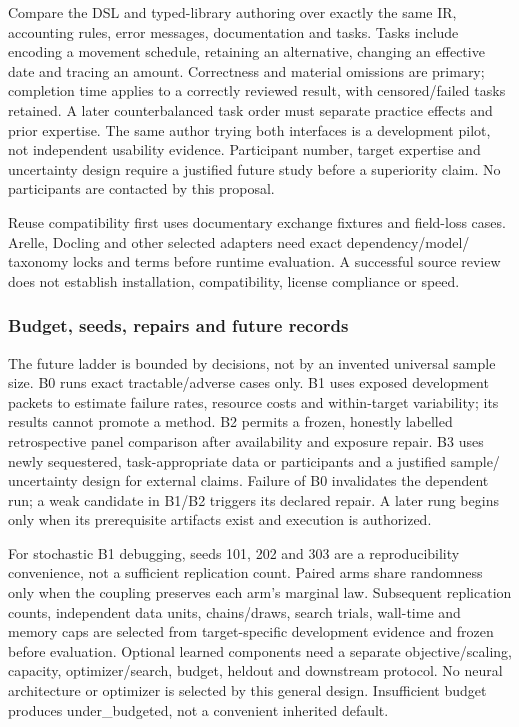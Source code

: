 Compare the DSL and typed-library authoring over exactly the same IR, accounting rules, error messages, documentation and tasks. Tasks include encoding a movement schedule, retaining an alternative, changing an effective date and tracing an amount. Correctness and material omissions are primary; completion time applies to a correctly reviewed result, with censored/failed tasks retained. A later counterbalanced task order must separate practice effects and prior expertise. The same author trying both interfaces is a development pilot, not independent usability evidence. Participant number, target expertise and uncertainty design require a justified future study before a superiority claim. No participants are contacted by this proposal.

Reuse compatibility first uses documentary exchange fixtures and field-loss cases. Arelle, Docling and other selected adapters need exact dependency/model/ taxonomy locks and terms before runtime evaluation. A successful source review does not establish installation, compatibility, license compliance or speed.

\hypertarget{budget-seeds-repairs-and-future-records}{%
\subsubsection{Budget, seeds, repairs and future records}\label{budget-seeds-repairs-and-future-records}}

The future ladder is bounded by decisions, not by an invented universal sample size. B0 runs exact tractable/adverse cases only. B1 uses exposed development packets to estimate failure rates, resource costs and within-target variability; its results cannot promote a method. B2 permits a frozen, honestly labelled retrospective panel comparison after availability and exposure repair. B3 uses newly sequestered, task-appropriate data or participants and a justified sample/ uncertainty design for external claims. Failure of B0 invalidates the dependent run; a weak candidate in B1/B2 triggers its declared repair. A later rung begins only when its prerequisite artifacts exist and execution is authorized.

For stochastic B1 debugging, seeds 101, 202 and 303 are a reproducibility convenience, not a sufficient replication count. Paired arms share randomness only when the coupling preserves each arm's marginal law. Subsequent replication counts, independent data units, chains/draws, search trials, wall-time and memory caps are selected from target-specific development evidence and frozen before evaluation. Optional learned components need a separate objective/scaling, capacity, optimizer/search, budget, heldout and downstream protocol. No neural architecture or optimizer is selected by this general design. Insufficient budget produces under\_budgeted, not a convenient inherited default.

